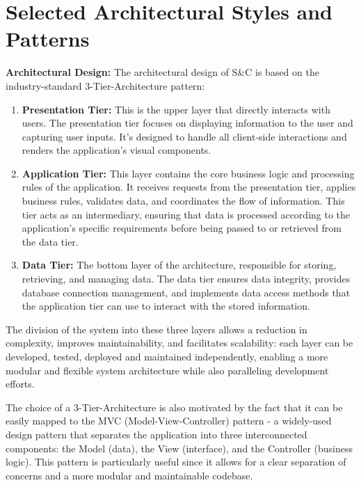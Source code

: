 \section{Selected Architectural Styles and Patterns}
\label{sec:selected-architectural-styles-patterns}%

\par{\textbf{Architectural Design:}} The architectural design of S\&C is based on the industry-standard 3-Tier-Architecture pattern:

\begin{enumerate}
      \item \textbf{Presentation Tier:} This is the upper layer that directly interacts with users. The presentation tier
            focuses on displaying information to the user and capturing user inputs. It's designed to handle all client-side
            interactions and renders the application's visual components.
      \item \textbf{Application Tier:} This layer contains the core business logic and processing rules of the
            application. It receives requests from the presentation tier, applies business rules, validates data, and
            coordinates the flow of information. This tier acts as an intermediary, ensuring that data is processed
            according to the application's specific requirements before being passed to or retrieved from the data tier.
      \item \textbf{Data Tier:} The bottom layer of the architecture, responsible for storing, retrieving, and managing
            data. The data tier ensures data integrity, provides database connection management, and implements data
            access methods that the application tier can use to interact with the stored information.
\end{enumerate}

The division of the system into these three layers allows a reduction in complexity, improves maintainability, and
facilitates scalability: each layer can be developed, tested, deployed and maintained independently, enabling a more
modular and flexible system architecture while also paralleling development efforts.

The choice of a 3-Tier-Architecture is also motivated by the fact that it can be easily mapped to the MVC
(Model-View-Controller) pattern - a widely-used design pattern that separates the application into three interconnected
components: the Model (data), the View (interface), and the Controller (business logic). This pattern is particularly
useful since it allows for a clear separation of concerns and a more modular and maintainable codebase.


